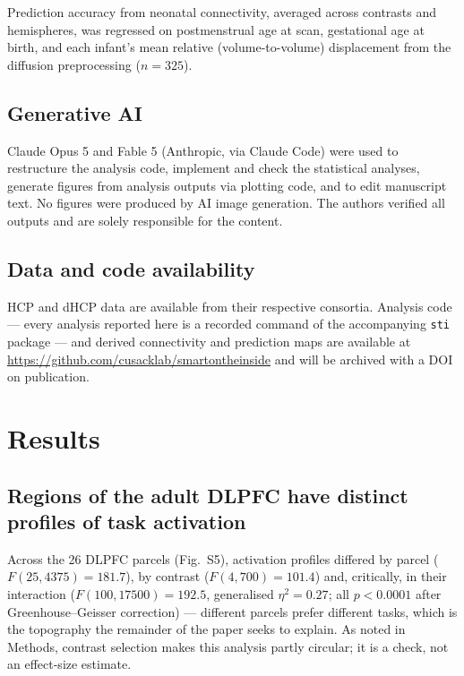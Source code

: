 \documentclass[11pt]{article}
\begin{document}
Prediction accuracy from neonatal connectivity, averaged across contrasts
and hemispheres, was regressed on postmenstrual age at scan, gestational age
at birth, and each infant's mean relative (volume-to-volume) displacement
from the diffusion preprocessing ($n = 325$).

\subsection{Generative AI}

Claude Opus 5 and Fable 5 (Anthropic, via Claude Code) were used to
restructure the analysis code, implement and check the statistical analyses,
generate figures from analysis outputs via plotting code, and to edit
manuscript text. No figures were produced by AI image generation. The
authors verified all outputs and are solely responsible for the content.

\subsection{Data and code availability}

HCP and dHCP data are available from their respective consortia. Analysis
code --- every analysis reported here is a recorded command of the
accompanying \texttt{sti} package --- and derived connectivity and
prediction maps are available at
\url{https://github.com/cusacklab/smartontheinside} and will be archived
with a DOI on publication.

\section{Results}

\subsection{Regions of the adult DLPFC have distinct profiles of task
activation}

Across the 26 DLPFC parcels (Fig.~S5), activation profiles differed by parcel
($F(25, 4375) = 181.7$), by contrast ($F(4, 700) = 101.4$) and, critically,
in their interaction ($F(100, 17500) = 192.5$, generalised $\eta^2 = 0.27$;
all $p < 0.0001$ after Greenhouse--Geisser correction) --- different parcels
prefer different tasks, which is the topography the remainder of the paper
seeks to explain. As noted in Methods, contrast selection makes this
analysis partly circular; it is a check, not an effect-size estimate.
\end{document}
